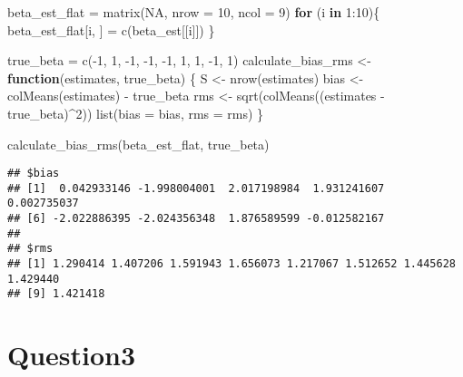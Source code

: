 \documentclass[
]{article}
\newenvironment{Shaded}{\begin{snugshade}}{\end{snugshade}}
\newcommand{\AttributeTok}[1]{\textcolor[rgb]{0.77,0.63,0.00}{#1}}
\newcommand{\ConstantTok}[1]{\textcolor[rgb]{0.00,0.00,0.00}{#1}}
\newcommand{\ControlFlowTok}[1]{\textcolor[rgb]{0.13,0.29,0.53}{\textbf{#1}}}
\newcommand{\DecValTok}[1]{\textcolor[rgb]{0.00,0.00,0.81}{#1}}
\newcommand{\FunctionTok}[1]{\textcolor[rgb]{0.00,0.00,0.00}{#1}}
\newcommand{\NormalTok}[1]{#1}
\newcommand{\OtherTok}[1]{\textcolor[rgb]{0.56,0.35,0.01}{#1}}
\newcommand{\SpecialCharTok}[1]{\textcolor[rgb]{0.00,0.00,0.00}{#1}}
\begin{document}
\begin{Shaded}
\begin{Highlighting}[]
\NormalTok{beta\_est\_flat }\OtherTok{=} \FunctionTok{matrix}\NormalTok{(}\ConstantTok{NA}\NormalTok{, }\AttributeTok{nrow =} \DecValTok{10}\NormalTok{, }\AttributeTok{ncol =} \DecValTok{9}\NormalTok{)}
\ControlFlowTok{for}\NormalTok{ (i }\ControlFlowTok{in} \DecValTok{1}\SpecialCharTok{:}\DecValTok{10}\NormalTok{)\{}
\NormalTok{  beta\_est\_flat[i, ] }\OtherTok{=} \FunctionTok{c}\NormalTok{(beta\_est[[i]])}
\NormalTok{\}}

\NormalTok{true\_beta }\OtherTok{=} \FunctionTok{c}\NormalTok{(}\SpecialCharTok{{-}}\DecValTok{1}\NormalTok{, }\DecValTok{1}\NormalTok{, }\SpecialCharTok{{-}}\DecValTok{1}\NormalTok{, }\SpecialCharTok{{-}}\DecValTok{1}\NormalTok{, }\SpecialCharTok{{-}}\DecValTok{1}\NormalTok{, }\DecValTok{1}\NormalTok{, }\DecValTok{1}\NormalTok{, }\SpecialCharTok{{-}}\DecValTok{1}\NormalTok{, }\DecValTok{1}\NormalTok{)}
\NormalTok{calculate\_bias\_rms }\OtherTok{\textless{}{-}} \ControlFlowTok{function}\NormalTok{(estimates, true\_beta) \{}
\NormalTok{  S }\OtherTok{\textless{}{-}} \FunctionTok{nrow}\NormalTok{(estimates)}
\NormalTok{  bias }\OtherTok{\textless{}{-}} \FunctionTok{colMeans}\NormalTok{(estimates) }\SpecialCharTok{{-}}\NormalTok{ true\_beta}
\NormalTok{  rms }\OtherTok{\textless{}{-}} \FunctionTok{sqrt}\NormalTok{(}\FunctionTok{colMeans}\NormalTok{((estimates }\SpecialCharTok{{-}}\NormalTok{ true\_beta)}\SpecialCharTok{\^{}}\DecValTok{2}\NormalTok{))}
  \FunctionTok{list}\NormalTok{(}\AttributeTok{bias =}\NormalTok{ bias, }\AttributeTok{rms =}\NormalTok{ rms)}
\NormalTok{\}}

\FunctionTok{calculate\_bias\_rms}\NormalTok{(beta\_est\_flat, true\_beta)}
\end{Highlighting}
\end{Shaded}

\begin{verbatim}
## $bias
## [1]  0.042933146 -1.998004001  2.017198984  1.931241607  0.002735037
## [6] -2.022886395 -2.024356348  1.876589599 -0.012582167
## 
## $rms
## [1] 1.290414 1.407206 1.591943 1.656073 1.217067 1.512652 1.445628 1.429440
## [9] 1.421418
\end{verbatim}

\hypertarget{question3}{%
\section{Question3}\label{question3}}
\end{document}
